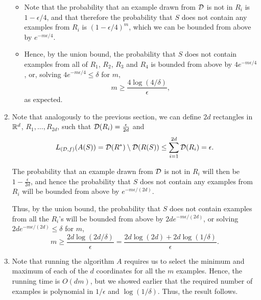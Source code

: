 \begin{ex}
\begin{enumerate}
\begin{itemize}
            \item Note that the probability that an example drawn from $\mathcal{D}$ is
                  not in $R_i$ is $1-\epsilon/4$, and that therefore the probability
                  that $S$ does not contain any examples from $R_i$ is
                  $(1-\epsilon/4)^m$, which we can be bounded from above by
                  $e^{-m\epsilon/4}$.
            \item Hence, by the union bound, the probability that $S$ does not
                  contain examples from all of $R_1$, $R_2$, $R_3$ and $R_4$ is
                  bounded from above by $4e^{-m\epsilon/4}$,
                  or, solving $4e^{-m\epsilon/4}\leq \delta$ for $m$,
                  \[
                    m\geq \frac{4\log(4/\delta)}{\epsilon},
                  \]
                  as expected.
          \end{itemize}
    \item Note that analogously to the previous section, we can define $2d$
          rectangles in $\mathbb{R}^d$, $R_1,\ldots,R_{2d}$, such that
          $\mathcal{D}(R_i)=\frac{\epsilon}{2d}$ and
          \begin{align*}
            L_{(\mathcal{D},f)}(A(S))
            =\mathcal{D}(R^*)\setminus \mathcal{D}(R(S))
            \leq \sum_{i=1}^{2d}\mathcal{D}(R_i)
            =\epsilon.
          \end{align*}

          The probability that an example drawn from $\mathcal{D}$ is not in $R_i$ will
          then be $1-\frac{\epsilon}{2d}$, and hence the probability that $S$
          does not contain any examples from $R_i$ will be bounded from above by
          $e^{-m\epsilon/(2d)}$.

          Thus, by the union bound, the probability that $S$ does not contain
          examples from all the $R_i$'s will be bounded from above by
          $2de^{-m\epsilon/(2d)}$, or solving
          $2de^{-m\epsilon/(2d)}\leq \delta$ for $m$,
          \[
            m\geq \frac{2d\log(2d/\delta)}{\epsilon}
            =\frac{2d\log(2d)+2d\log(1/\delta)}{\epsilon}.
          \]
    \item Note that running the algorithm $A$ requires us to select the minimum
          and maximum of each of the $d$ coordinates for all the $m$ examples.
          Hence, the running time is $O(dm)$, but we showed earlier that the
          required number of examples is polynomial in $1/\epsilon$ and
          $\log(1/\delta)$. Thus, the result follows.
  \end{enumerate}
\end{ex}